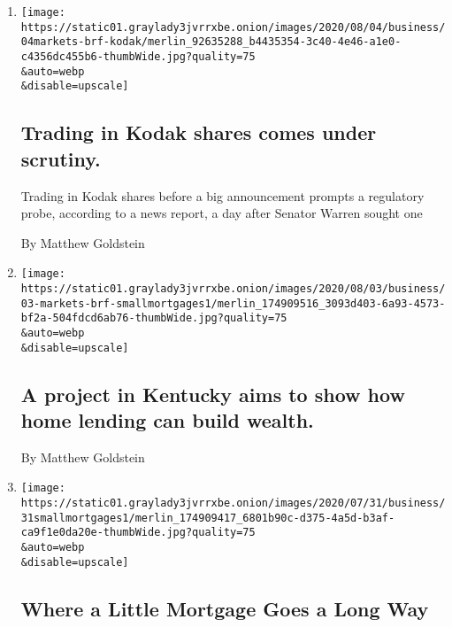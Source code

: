 \begin{enumerate}
\def\labelenumi{\arabic{enumi}.}
\item
  \href{/live/2020/08/04/business/stock-market-today-coronavirus/trading-in-kodak-shares-comes-under-scrutiny}{}

  \texttt{[image: https://static01.graylady3jvrrxbe.onion/images/2020/08/04/business/04markets-brf-kodak/merlin\_92635288\_b4435354-3c40-4e46-a1e0-c4356dc455b6-thumbWide.jpg?quality=75\\\&auto=webp\\\&disable=upscale]}

  \hypertarget{trading-in-kodak-shares-comes-under-scrutiny}{%
  \subsection{Trading in Kodak shares comes under
  scrutiny.}\label{trading-in-kodak-shares-comes-under-scrutiny}}

  Trading in Kodak shares before a big announcement prompts a regulatory
  probe, according to a news report, a day after Senator Warren sought
  one

  By Matthew Goldstein
\item
  \href{/2020/08/03/business/a-project-in-kentucky-aims-to-show-how-home-lending-can-build-wealth.html}{}

  \texttt{[image: https://static01.graylady3jvrrxbe.onion/images/2020/08/03/business/03-markets-brf-smallmortgages1/merlin\_174909516\_3093d403-6a93-4573-bf2a-504fdcd6ab76-thumbWide.jpg?quality=75\\\&auto=webp\\\&disable=upscale]}

  \hypertarget{a-project-in-kentucky-aims-to-show-how-home-lending-can-build-wealth}{%
  \subsection{A project in Kentucky aims to show how home lending can
  build
  wealth.}\label{a-project-in-kentucky-aims-to-show-how-home-lending-can-build-wealth}}

  By Matthew Goldstein
\item
  \href{/2020/08/02/business/mortgages-affordable-housing.html}{}

  \texttt{[image: https://static01.graylady3jvrrxbe.onion/images/2020/07/31/business/31smallmortgages1/merlin\_174909417\_6801b90c-d375-4a5d-b3af-ca9f1e0da20e-thumbWide.jpg?quality=75\\\&auto=webp\\\&disable=upscale]}

  \hypertarget{where-a-little-mortgage-goes-a-long-way}{%
  \subsection{Where a Little Mortgage Goes a Long
  Way}\label{where-a-little-mortgage-goes-a-long-way}}


\end{enumerate}
